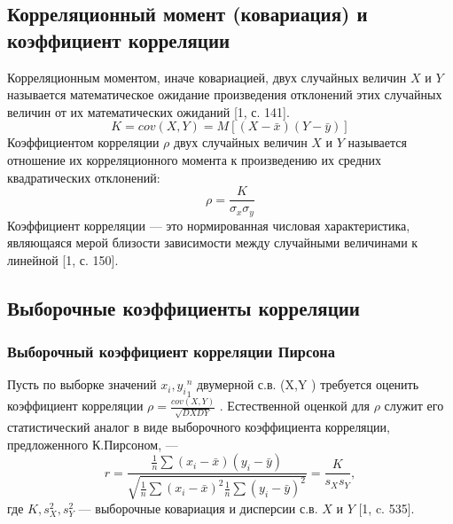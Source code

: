 \documentclass[a4paper]{article}
\begin{document}
        \subsection{Корреляционный момент (ковариация) и коэффициент корреляции}
            \noindent Корреляционным моментом, иначе ковариацией, двух случайных величин $X$ и $Y$ называется математическое ожидание произведения отклонений этих случайных величин от их математических ожиданий [1, с. 141].
            \begin{equation}
                K = cov(X, Y) = M[(X - \bar{x})(Y - \bar{y})]
                \label{K}
            \end{equation}
            Коэффициентом корреляции $\rho$ двух случайных величин $X$ и $Y$ называется отношение их корреляционного момента к произведению их средних квадратических отклонений:
            \begin{equation}
                \rho = \frac{K}{\sigma_{x}\sigma_{y}}
                \label{ro}
            \end{equation}
            Коэффициент корреляции — это нормированная числовая характеристика, являющаяся мерой близости зависимости между случайными величинами к линейной [1, с. 150].

        \subsection{Выборочные коэффициенты корреляции}
            \subsubsection{Выборочный коэффициент корреляции Пирсона}
                \noindent Пусть по выборке значений ${x_{i},y_{i}}^{n}_{1}$ двумерной с.в. (X,Y ) требуется оценить коэффициент корреляции $\rho = \frac{cov(X,Y)}{\sqrt{DXDY}}$ . Естественной оценкой для $\rho$ служит его статистический аналог в виде выборочного коэффициента корреляции, предложенного К.Пирсоном, —
                \begin{equation}
                    r = \frac{
                        \frac{1}{n}\sum{(x_{i} - \bar{x})(y_{i}-\bar{y})}
                    }{
                    \sqrt{\frac{1}{n}\sum{(x_{i} - \bar{x})^{2}}\frac{1}{n}\sum{(y_{i} - \bar{y})^{2}}}
                    }=\frac{K}{s_{X}s_{Y}},
                    \label{r}
                \end{equation}
                где $K,s^{2}_{X},s^{2}_{Y}$ — выборочные ковариация и дисперсии с.в. $X$ и $Y$ [1, c. 535].
\end{document}
